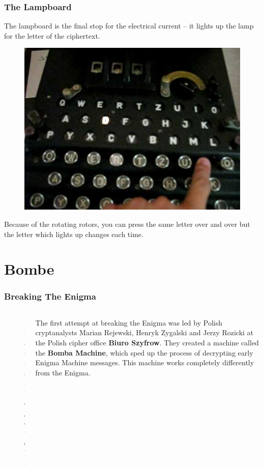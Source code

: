 \documentclass{beamer}
\newcommand{\<}{\langle}
\renewcommand{\>}{\rangle}
\begin{document}
\begin{frame}
\frametitle{The Lampboard}

The lampboard is the final stop for the electrical current -- it lights up the lamp for the letter of the ciphertext. 
\begin{figure}
\includegraphics[scale=.35]{IMG/lamp}
\end{figure}
Because of the rotating rotors, you can press the same letter over and over but the letter which lights up changes each time. 
\end{frame}

\section{Bombe}

\begin{frame}
\frametitle{Breaking The Enigma}

\begin{columns}
\begin{column}{.5\textwidth}
\begin{figure}
\includegraphics[scale=1]{IMG/rejewski}
\caption{\scriptsize Marian Rejewski}
\end{figure}
\end{column}
\begin{column}{.5\textwidth}\small
The first attempt at breaking the Enigma was led by Polish cryptanalysts Marian Rejewski, Henryk Zygalski and Jerzy Rozicki at the Polish cipher office \textbf{Biuro Szyfrow}. They created a machine called the \textbf{Bomba Machine}, which sped up the process of decrypting early Enigma Machine messages. This machine works completely differently from the Enigma. 
\end{column}
\end{columns}
\end{frame}
\end{document}
